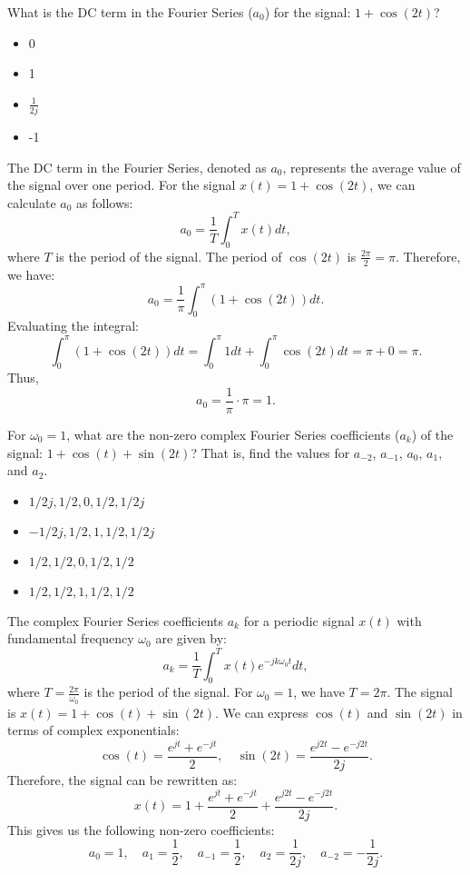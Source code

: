 \documentclass{ee102_notes}
\begin{document}
\begin{popquiz}
    What is the DC term in the Fourier Series ($a_0$) for the signal: $1 + \cos(2t)$?
    \begin{itemize}
        \item 0
        \item 1
        \item $\frac{1}{2j}$
        \item -1
    \end{itemize}
    \popqsplit
    The DC term in the Fourier Series, denoted as $a_0$, represents the average value of the signal over one period. For the signal $x(t) = 1 + \cos(2t)$, we can calculate $a_0$ as follows:
    \[
    a_0 = \frac{1}{T} \int_{0}^{T} x(t) dt,
    \]
    where $T$ is the period of the signal. The period of $\cos(2t)$ is $\frac{2\pi}{2} = \pi$. Therefore, we have:
    \[
    a_0 = \frac{1}{\pi} \int_{0}^{\pi} (1 + \cos(2t)) dt.
    \]
    Evaluating the integral:
    \[
    \int_{0}^{\pi} (1 + \cos(2t)) dt = \int_{0}^{\pi} 1 dt + \int_{0}^{\pi} \cos(2t) dt = \pi + 0 = \pi.
    \]
    Thus,
    \[
    a_0 = \frac{1}{\pi} \cdot \pi = 1.
    \]
\end{popquiz}

\begin{popquiz}
    For $\omega_0 = 1$, what are the non-zero complex Fourier Series coefficients ($a_k$) of the signal: $1 + \cos(t) + \sin(2t)$? That is, find the values for $a_{-2}$, $a_{-1}$, $a_0$, $a_1$, and $a_2$.
    \begin{itemize}
        \item $1/2j, 1/2, 0, 1/2, 1/2j$
        \item $-1/2j, 1/2, 1, 1/2, 1/2j$
        \item $1/2, 1/2, 0, 1/2, 1/2$
        \item $1/2, 1/2, 1, 1/2, 1/2$
    \end{itemize}

    \popqsplit
    The complex Fourier Series coefficients $a_k$ for a periodic signal $x(t)$ with fundamental frequency $\omega_0$ are given by:
    \[
    a_k = \frac{1}{T} \int_{0}^{T} x(t) e^{-j k \omega_0 t} dt,
    \]
    where $T = \frac{2\pi}{\omega_0}$ is the period of the signal. For $\omega_0 = 1$, we have $T = 2\pi$. The signal is $x(t) = 1 + \cos(t) + \sin(2t)$.
    We can express $\cos(t)$ and $\sin(2t)$ in terms of complex exponentials:
    \[
    \cos(t) = \frac{e^{j t} + e^{-j t}}{2}, \quad \sin(2t) = \frac{e^{j 2t} - e^{-j 2t}}{2j}.
    \]
    Therefore, the signal can be rewritten as:
    \[
    x(t) = 1 + \frac{e^{j t} + e^{-j t}}{2} + \frac{e^{j 2t} - e^{-j 2t}}{2j}.
    \]
    This gives us the following non-zero coefficients:
    \[ 
    a_0 = 1, \quad a_1 = \frac{1}{2}, \quad a_{-1} = \frac{1}{2}, \quad a_2 = \frac{1}{2j}, \quad a_{-2} = -\frac{1}{2j}.
    \]
\end{popquiz}
\end{document}
